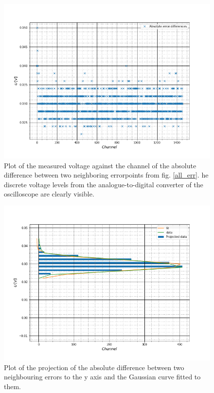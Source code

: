 \begin{figure}[h]
	\includegraphics[scale=0.5]{Bild/abs_diff}
	\centering
	\caption[Plot of the absolute errordifference]{Plot of the measured voltage against the channel of the absolute difference between two neighboring errorpoints from fig. \ref{all_err}. he discrete voltage levels from the analogue-to-digital converter of the oscilloscope are clearly visible.}
	\label{err_diff}
\end{figure}

\begin{figure}[h]
	\includegraphics[scale=0.5]{Bild/projection}
	\centering
	\caption[Plot of the projection of fig. \ref{err_diff}]{Plot of the projection of the absolute difference between two neighbouring errors to the y axis and the Gaussian curve fitted to them.}
	\label{gaussian_errs}
\end{figure}

